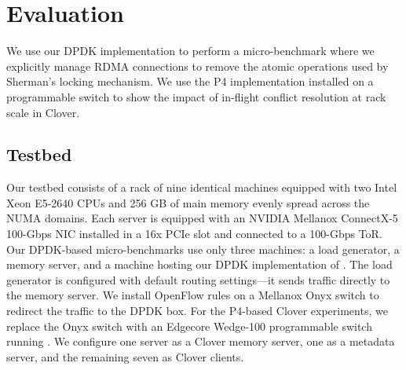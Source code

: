 \section{Evaluation}
\label{s:results}


We use our DPDK implementation to perform a micro-benchmark where we explicitly
manage RDMA connections to remove the atomic operations used by Sherman's
locking mechanism.  We use the P4 implementation installed on a programmable
switch to show the impact of in-flight conflict resolution at rack scale in
Clover.


\subsection{Testbed} 

Our testbed consists of a rack of nine identical machines equipped
with two Intel Xeon E5-2640 CPUs and 256 GB of main memory evenly
spread across the NUMA domains. Each server is equipped with an
NVIDIA Mellanox ConnectX-5 100-Gbps NIC installed in a 16x PCIe slot and connected to a 100-Gbps ToR.  Our DPDK-based
micro-benchmarks use only three machines: a load generator, a memory
server, and a machine hosting our DPDK implementation of {\sword}.
The load generator is configured with default routing settings---it
sends traffic directly to the memory server.  We install OpenFlow
rules on a Mellanox Onyx switch to redirect the traffic to the DPDK
box.  For the P4-based Clover experiments, we replace the Onyx switch
with an Edgecore Wedge-100 programmable switch running \sword.
We configure one server as a Clover memory server, one as a metadata
server, and the remaining seven as Clover clients.



